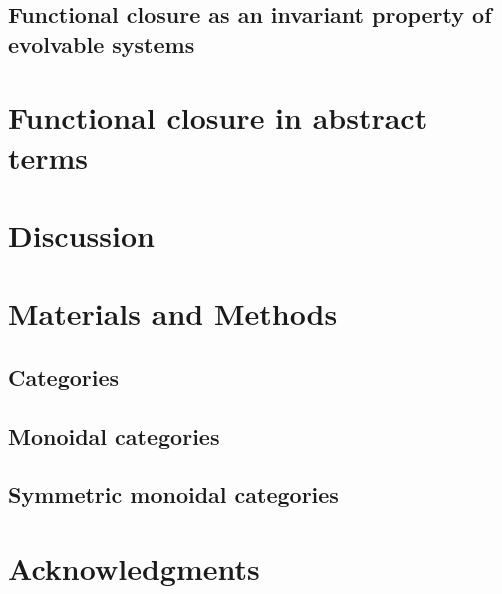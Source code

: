 \documentclass[10pt]{article}
\begin{document}
\subsection*{Functional closure as an invariant property of evolvable systems}

\section*{Functional closure in abstract terms}


\section*{Discussion}

\section*{Materials and Methods}
\subsection*{Categories}


\subsection*{Monoidal categories}


\subsection*{Symmetric monoidal categories}


\section*{Acknowledgments}




\end{document}
